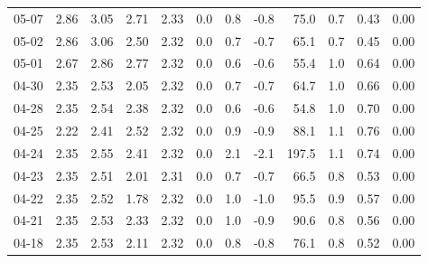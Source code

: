 \begin{threeparttable}
{\begin{tabular}{lrrrrrrrrrrr}
  05-07 &          2.86 &          3.05 &          2.71 &        2.33 &                 0.0 &                 0.8 &       -0.8 &                75.0 &              0.7 &            0.43 &                   0.00 \\
  05-02 &          2.86 &          3.06 &          2.50 &        2.32 &                 0.0 &                 0.7 &       -0.7 &                65.1 &              0.7 &            0.45 &                   0.00 \\
  05-01 &          2.67 &          2.86 &          2.77 &        2.32 &                 0.0 &                 0.6 &       -0.6 &                55.4 &              1.0 &            0.64 &                   0.00 \\
  04-30 &          2.35 &          2.53 &          2.05 &        2.32 &                 0.0 &                 0.7 &       -0.7 &                64.7 &              1.0 &            0.66 &                   0.00 \\
  04-28 &          2.35 &          2.54 &          2.38 &        2.32 &                 0.0 &                 0.6 &       -0.6 &                54.8 &              1.0 &            0.70 &                   0.00 \\
  04-25 &          2.22 &          2.41 &          2.52 &        2.32 &                 0.0 &                 0.9 &       -0.9 &                88.1 &              1.1 &            0.76 &                   0.00 \\
  04-24 &          2.35 &          2.55 &          2.41 &        2.32 &                 0.0 &                 2.1 &       -2.1 &               197.5 &              1.1 &            0.74 &                   0.00 \\
  04-23 &          2.35 &          2.51 &          2.01 &        2.31 &                 0.0 &                 0.7 &       -0.7 &                66.5 &              0.8 &            0.53 &                   0.00 \\
  04-22 &          2.35 &          2.52 &          1.78 &        2.32 &                 0.0 &                 1.0 &       -1.0 &                95.5 &              0.9 &            0.57 &                   0.00 \\
  04-21 &          2.35 &          2.53 &          2.33 &        2.32 &                 0.0 &                 1.0 &       -0.9 &                90.6 &              0.8 &            0.56 &                   0.00 \\
  04-18 &          2.35 &          2.53 &          2.11 &        2.32 &                 0.0 &                 0.8 &       -0.8 &                76.1 &              0.8 &            0.52 &                   0.00 \\

\end{tabular}}
\end{threeparttable}
